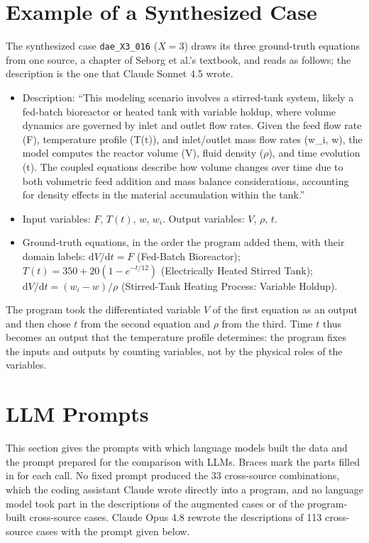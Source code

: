 \section{Example of a Synthesized Case}
\label{app:example}
The synthesized case \texttt{dae\_X3\_016} ($X = 3$) draws its three ground-truth equations from
one source, a chapter of Seborg et al.'s textbook, and reads as follows; the description is the one
that Claude Sonnet 4.5 wrote.
\begin{itemize}
  \item Description: ``This modeling scenario involves a stirred-tank system, likely a fed-batch
    bioreactor or heated tank with variable holdup, where volume dynamics are governed by inlet and
    outlet flow rates. Given the feed flow rate (F), temperature profile (T(t)), and inlet/outlet
    mass flow rates (w\_i, w), the model computes the reactor volume (V), fluid density ($\rho$),
    and time evolution (t). The coupled equations describe how volume changes over time due to
    both volumetric feed addition and mass balance considerations, accounting for density effects
    in the material accumulation within the tank.''
  \item Input variables: $F$, $T(t)$, $w$, $w_i$. Output variables: $V$, $\rho$, $t$.
  \item Ground-truth equations, in the order the program added them, with their domain labels:
    $\mathrm{d}V/\mathrm{d}t = F$ (Fed-Batch Bioreactor);
    $T(t) = 350 + 20 (1 - e^{-t/12})$ (Electrically Heated Stirred Tank);
    $\mathrm{d}V/\mathrm{d}t = (w_i - w)/\rho$ (Stirred-Tank Heating Process: Variable Holdup).
\end{itemize}
The program took the differentiated variable $V$ of the first equation as an output and then chose
$t$ from the second equation and $\rho$ from the third. Time $t$ thus becomes an output that the
temperature profile determines: the program fixes the inputs and outputs by counting variables,
not by the physical roles of the variables.

\section{LLM Prompts}
\label{app:prompts}
This section gives the prompts with which language models built the data and the prompt prepared
for the comparison with LLMs. Braces mark the parts filled in for each call. No fixed prompt
produced the 33 cross-source combinations, which the coding assistant Claude wrote directly into a
program, and no language model took part in the descriptions of the augmented cases or of the
program-built cross-source cases. Claude Opus 4.8 rewrote the descriptions of 113 cross-source cases
with the prompt given below.

